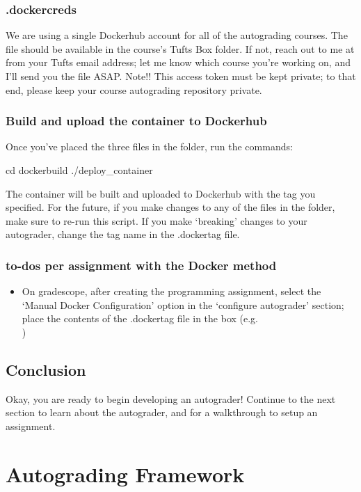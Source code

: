\documentclass[11pt]{report}
\begin{document}
\subsection*{.dockercreds}
We are using a single Dockerhub account for all of the autograding courses. The file
 should be available in the course's Tufts Box folder. If not, reach out to 
me at  from your Tufts email address; let me know which course you're 
working on, and I'll send you the file ASAP. 
Note!! This access token must be kept private; to that end, please keep your course autograding
repository private.

\subsection*{Build and upload the container to Dockerhub}
Once you've placed the three files in the  folder, run the commands:
\begin{bashcodeblock}
cd dockerbuild
./deploy_container
\end{bashcodeblock}
The container will be built and uploaded to Dockerhub with the tag you specified. For the future,
if you make changes to any of the files in the  folder, make sure to re-run this 
script. If you make `breaking' changes to your autograder, change the tag name in the .dockertag file.

\subsection*{to-dos per assignment with the Docker method} 
\begin{itemize}
      \item On gradescope, after creating the programming assignment, select the `Manual Docker 
      Configuration' option in the `configure autograder' section; place the contents of the 
      .dockertag file in the box (e.g. \\)
\end{itemize}

\section*{Conclusion}
Okay, you are ready to begin developing an autograder! Continue to the next section to learn 
about the autograder, and for a walkthrough to setup an assignment. 

\chapter*{Autograding Framework}
\end{document}
